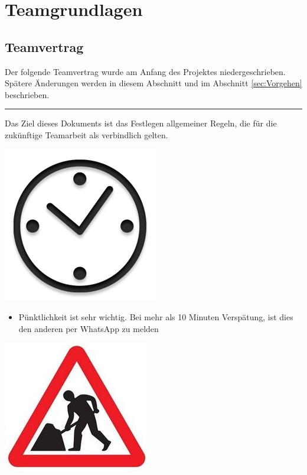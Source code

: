 \chapter{Teamgrundlagen}
\label{sec:Teamgrundlagen}

\section{Teamvertrag}

Der folgende Teamvertrag wurde am Anfang des Projektes niedergeschrieben. Spätere Änderungen werden in diesem Abschnitt und im Abschnitt \ref{sec:Vorgehen} beschrieben.

\vspace{20mm}
\rule{\textwidth}{1pt}

Das Ziel dieses Dokuments ist das Festlegen allgemeiner Regeln, die für die zukünftige Teamarbeit als verbindlich gelten.\\

\begin{center}
\includegraphics[scale=0.25]{img/clock}\\
\end{center}


\begin{itemize}
\item Pünktlichkeit ist sehr wichtig. Bei mehr als 10 Minuten Verspätung, ist dies den anderen per WhatsApp zu melden
\end{itemize}

\begin{center}
\includegraphics[scale=1.1]{img/work}\\
\end{center}


